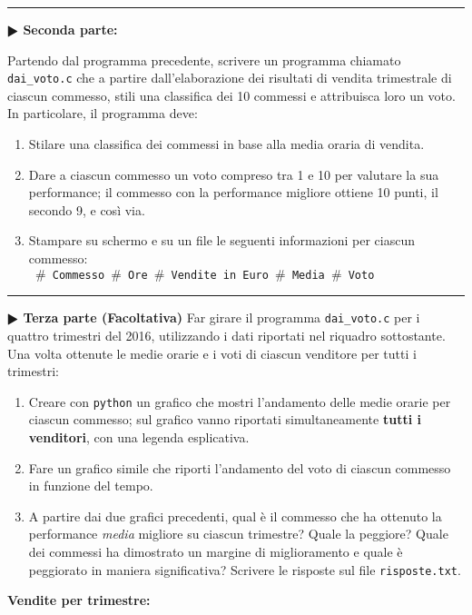 \documentclass[11pt]{article}
\begin{document}
\hrule
\vspace{2mm}
\textbf{$\RHD$ Seconda parte:}

Partendo dal programma precedente, scrivere un programma chiamato \texttt{dai\_voto.c} che a partire dall'elaborazione dei risultati di
vendita trimestrale di ciascun commesso, stili una classifica dei 10 commessi e attribuisca loro
un voto. In particolare, il programma deve: 
\begin{enumerate}
\item Stilare una classifica dei commessi in base alla media oraria di vendita.
\item Dare a ciascun commesso un voto compreso tra 1 e 10 per valutare la sua performance; il commesso con la performance migliore ottiene 10 punti, il secondo 9, e così via.
\item Stampare su schermo e su un file le seguenti informazioni per ciascun commesso:\\
\texttt{
$\#$  Commesso $\#$ Ore $\#$ Vendite in Euro $\#$ Media $\#$ Voto\\
}
\end{enumerate}


\hrule
\vspace{2mm}
\textbf{$\RHD$ Terza parte (Facoltativa)}
Far girare il programma \texttt{dai\_voto.c} per i quattro trimestri del 2016, utilizzando i dati riportati nel riquadro sottostante. Una volta ottenute le medie orarie e i voti di ciascun venditore per tutti i trimestri:
\begin{enumerate}
\item Creare con \texttt{python} un grafico che mostri l'andamento delle medie orarie per ciascun commesso; sul grafico vanno riportati simultaneamente {\bf tutti i venditori}, con una legenda esplicativa.
\item Fare un grafico simile che riporti l'andamento del voto di ciascun commesso in funzione del tempo.
\item A partire dai due grafici precedenti, qual è il commesso che ha ottenuto la performance {\em media\/} migliore su ciascun trimestre? Quale la peggiore?
Quale dei commessi ha dimostrato un margine di miglioramento e quale \`e peggiorato in maniera significativa?
Scrivere le risposte sul file \texttt{risposte.txt}.
\end{enumerate}


{\bf Vendite per trimestre:}
\end{document}
